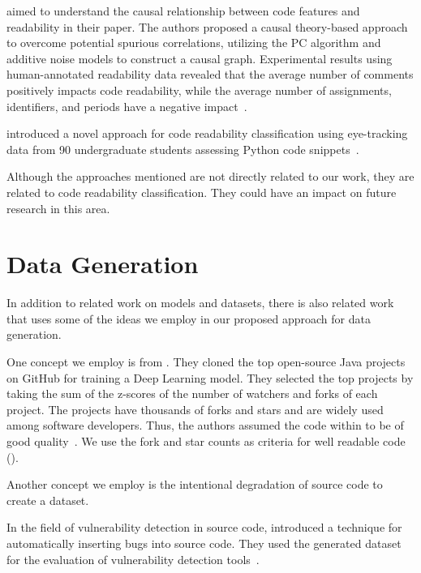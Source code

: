 \documentclass[%
class=scrreprt,
chapterprefix=false,%
open=right,%
twoside=true,%
paper=a4,%
logofile={Logo\_zentral\_farbig\_EN.png},%
thesistype=master,%
UKenglish,%
]{se2thesis}
\theoremstyle{definition}
\begin{document}
	\citeauthor{mi2023makes} aimed to understand the causal relationship between code features and readability in their paper. The authors proposed a causal theory-based approach to overcome potential spurious correlations, utilizing the PC algorithm and additive noise models to construct a causal graph. Experimental results using human-annotated readability data revealed that the average number of comments positively impacts code readability, while the average number of assignments, identifiers, and periods have a negative impact~\cite{mi2023makes}.
	
	\citeauthor{segedinac2024assessing} introduced a novel approach for code readability classification using eye-tracking data from 90 undergraduate students assessing Python code snippets~\cite{segedinac2024assessing}.
	
	Although the approaches mentioned are not directly related to our work, they are related to code readability classification. They could have an impact on future research in this area.
	
\section{Data Generation} \label{Data Generation}

	In addition to related work on models and datasets, there is also related work that uses some of the ideas we employ in our proposed approach for data generation. 
	
	One concept we employ is from \citeauthor{allamanis2016convolutional}. They cloned the top open-source Java projects on GitHub for training a Deep Learning model. They selected the top projects by taking the sum of the z-scores of the number of watchers and forks of each project. The projects have thousands of forks and stars and are widely used among software developers. Thus, the authors assumed the code within to be of good quality~\cite{allamanis2016convolutional}. We use the fork and star counts as criteria for well readable code ().
	
	Another concept we employ is the intentional degradation of source code to create a dataset. 
	
	In the field of vulnerability detection in source code, \citeauthor{dolan2016lava} introduced a technique for automatically inserting bugs into source code. They used the generated dataset for the evaluation of vulnerability detection tools~\cite{dolan2016lava}. 
\end{document}
